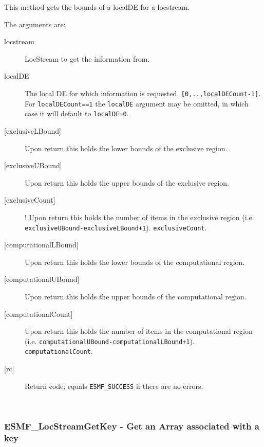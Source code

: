       This method gets the bounds of a localDE for a locstream.
  
       The arguments are:
       \begin{description}
       \item[{locstream}]
            LocStream to get the information from.
       \item[{localDE}]
           The local DE for which information is requested. {\tt [0,..,localDECount-1]}.
           For {\tt localDECount==1} the {\tt localDE} argument may be omitted,
            in which case it will default to {\tt localDE=0}.
       \item[{[exclusiveLBound]}]
            Upon return this holds the lower bounds of the exclusive region.
       \item[{[exclusiveUBound]}]
            Upon return this holds the upper bounds of the exclusive region.
       \item[{[exclusiveCount]}]
  !          Upon return this holds the number of items in the exclusive region
       \newline
            (i.e. {\tt exclusiveUBound-exclusiveLBound+1}). {\tt exclusiveCount}.
       \item[{[computationalLBound]}]
            Upon return this holds the lower bounds of the computational region.
       \item[{[computationalUBound]}]
            Upon return this holds the upper bounds of the computational region.
       \item[{[computationalCount]}]
            Upon return this holds the number of items in the computational region
       \newline
            (i.e. {\tt computationalUBound-computationalLBound+1}). {\tt computationalCount}.
       \item[{[rc]}]
            Return code; equals {\tt ESMF\_SUCCESS} if there are no errors.
     \end{description}
   
 
\mbox{}\hrulefill\ 
 
\subsubsection [ESMF\_LocStreamGetKey] {ESMF\_LocStreamGetKey - Get an Array associated with a key}


